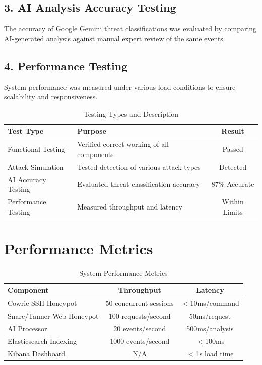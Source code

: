\documentclass[12pt,a4paper]{report}
\begin{document}
\subsection*{3. AI Analysis Accuracy Testing}

The accuracy of Google Gemini threat classifications was evaluated by comparing AI-generated analysis against manual expert review of the same events.

\subsection*{4. Performance Testing}

System performance was measured under various load conditions to ensure scalability and responsiveness.

\begin{table}[h]
\centering
\caption{Testing Types and Description}
\label{tab:testing_types}
\begin{tabular}{|l|p{7cm}|c|}
\hline
\textbf{Test Type} & \textbf{Purpose} & \textbf{Result} \\
\hline
Functional Testing & Verified correct working of all components & Passed \\
\hline
Attack Simulation & Tested detection of various attack types & Detected \\
\hline
AI Accuracy Testing & Evaluated threat classification accuracy & 87\% Accurate \\
\hline
Performance Testing & Measured throughput and latency & Within Limits \\
\hline
\end{tabular}
\end{table}

\section{Performance Metrics}

\begin{table}[h]
\centering
\caption{System Performance Metrics}
\label{tab:performance_metrics}
\begin{tabular}{|l|c|c|}
\hline
\textbf{Component} & \textbf{Throughput} & \textbf{Latency} \\
\hline
Cowrie SSH Honeypot & 50 concurrent sessions & $<$10ms/command \\
\hline
Snare/Tanner Web Honeypot & 100 requests/second & 50ms/request \\
\hline
AI Processor & 20 events/second & 500ms/analysis \\
\hline
Elasticsearch Indexing & 1000 events/second & $<$100ms \\
\hline
Kibana Dashboard & N/A & $<$1s load time \\
\hline
\end{tabular}
\end{table}
\end{document}
